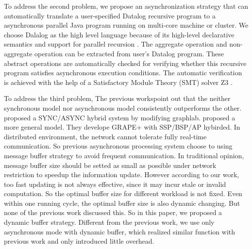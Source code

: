 To address the second problem, we propose an asynchronization strategy that can automatically translate a user-specified Datalog recursive program to a asynchronous parallel Java program running on multi-core machine or cluster. We choose Dalalog as the high level language because of its high-level declarative semantics and support for parallel recursion \cite{Shkapsky:2016:BDA:2882903.2915229}. The aggregate operation and non-aggregate operation can be extracted from user's Datalog program. These abstract operations are automatically checked for verifying whether this recursive program satisfies asynchronous execution conditions. The automatic verification is achieved with the help of a Satisfactory Module Theory (SMT) solver Z3 \cite{DeMoura:2008:ZES:1792734.1792766}.

{\color{red}
To address the third problem, The previous works\cite{Fan2018Adaptive,Xie2015SYNC}point out that the neither synchronous model nor asynchronous model consistently outperforms the other. \cite{Xie2015SYNC}proposed a SYNC/ASYNC hybrid system by modifying graphlab. \cite{Fan2018Adaptive} proposed a more general model. They develope GRAPE+ with SSP/BSP/AP hybirded.%
In distributed environment, the network cannot tolerate fully real-time communication. So previous asynchronous processing system choose to using message buffer strategy to avoid frequent communication. In traditional opinion, message buffer size should be setted as small as possible under network restriction to speedup the information update.  However according to our work, too fast updating is not always effective, since it may incur stale or invalid computation. So the optimal buffer size for different workload is not fixed. Even within one running cycle, the optimal buffer size is also dynamic changing. But none of the previous work discussed this. So in this paper, we proposed a dynamic buffer strategy. Different from the previous work, we use only asynchronous mode with dynamic buffer, which realized similar function with previous work and only introduced little overhead.
}


